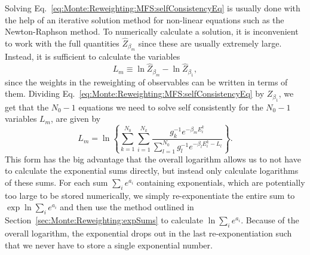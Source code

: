Solving Eq.~\eqref{eq:Monte:Reweighting:MFS:selfConsistencyEq} is usually done with the help of an iterative solution method for non-linear
equations such as the Newton-Raphson method. To numerically calculate a solution, it is inconvenient to work with the full quantities $\hat{Z}_{\beta_m}$
since these are usually extremely large. Instead, it is sufficient to calculate the variables
\begin{equation}
    \label{eq:Monte:Reweighting:MFS:logVars}
    L_m \equiv \ln \hat{Z}_{\beta_m} - \ln \hat{Z}_{\beta_1},
\end{equation}
since the weights in the reweighting of observables can be written in terms of them. Dividing Eq.~\eqref{eq:Monte:Reweighting:MFS:selfConsistencyEq} by $Z_{\beta_1}$,
we get that the $N_0-1$ equations we need to solve self consistently for the $N_0-1$ variables $L_m$, are given by
\begin{equation}
    \label{eq:Monte:Reweighting:MFS:modifiedSelfConsistencyEq}
    L_m = \ln\left\{\sum_{k=1}^{N_0}\sum_{i=1}^{N_k}\frac{g_k^{-1}e^{-\beta_mE_i^k}}{\sum_{l=1}^{N_0}g_l^{-1}e^{-\beta_lE_i^k-L_l}}\right\}.
\end{equation}
This form has the big advantage that the overall logarithm allows us to not have to calculate the exponential sums directly, but instead only calculate logarithms
of these sums. For each sum $\sum_ie^{a_i}$ containing exponentials, which are potentially too large to be stored numerically, we simply re-exponentiate the entire
sum to $\exp\ln\sum_ie^{a_i}$ and then use the method outlined in Section~\ref{sec:Monte:Reweighting:expSums} to calculate $\ln\sum_ie^{a_i}$. Because of the
overall logarithm, the exponential drops out in the last re-exponentiation such that we never have to store a single exponential number.

